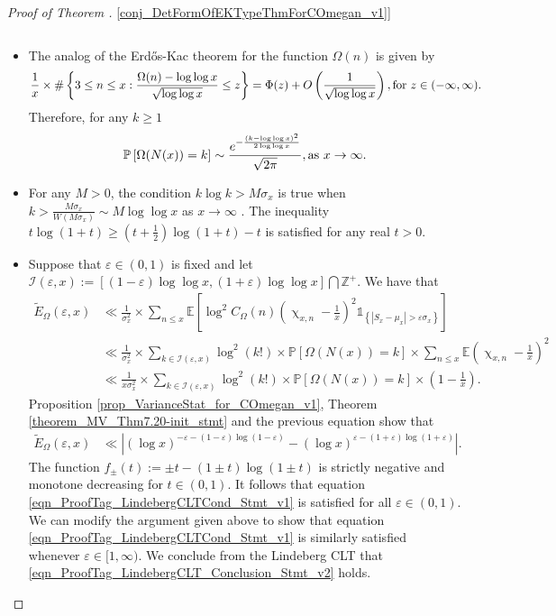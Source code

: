 \documentclass[11pt,reqno,a4letter]{article}
\newcommand{\hlocalref}[1]{\hyperref[#1]{\ref{#1}}}
\numberwithin{equation}{section}
\numberwithin{figure}{section}
\numberwithin{table}{section}
\renewcommand{\chi}{\upchi}
\theoremstyle{plain}
\numberwithin{theorem}{section}
\theoremstyle{definition}
\theoremstyle{remark}
\newcommand{\mathtext}[1]{\text{\rm #1}}
\begin{document}
\begin{proof}[Proof of Theorem \hlocalref{conj_DetFormOfEKTypeThmForCOmegan_v1}]
\begin{itemize}
\begin{equation}
\end{equation}
\item 
The analog of the Erd\H{o}s-Kac theorem for the function $\Omega(n)$ is given by 
\cite[Thm.~7.21; \S 7.4]{MV} 
\[
\frac{1}{x} \times \#\left\{3 \leq n \leq x: \frac{\Omega(n) - \log\log x}{\sqrt{\log\log x}} \leq z\right\} = 
     \Phi(z) + O\left(\frac{1}{\sqrt{\log\log x}}\right), \mathtext{ for } z \in (-\infty, \infty). 
\]
Therefore, for any $k \geq 1$ 
\[
\mathbb{P}\left[\Omega(N(x)) = k\right] \sim 
     \frac{e^{-\frac{(k-\log\log x)^2}{2\log\log x}}}{\sqrt{2\pi}}, 
     \mathtext{ as } x \rightarrow \infty. 
\]
\item 
For any $M > 0$, the condition $k\log k > M \sigma_x$ is true when 
$k > \frac{M \sigma_x}{W\left(M \sigma_x\right)} \sim M \log\log x$ 
as $x \rightarrow \infty$ \cite{LAMBERT-WFUNC-KNUTH}. 
The inequality $t \log(1+t) \geq \left(t + \frac{1}{2}\right) \log(1+t) - t$ 
is satisfied for any real $t > 0$. 
\item 
Suppose that $\varepsilon \in (0, 1)$ is fixed and 
let $\mathcal{I}(\varepsilon, x) := \left[(1-\varepsilon) \log\log x, (1+\varepsilon) \log\log x \right] \bigcap \mathbb{Z}^{+}$. 
We have that 
\begin{align*}
\widetilde{E}_{\Omega}(\varepsilon, x) & \ll 
     \frac{1}{\sigma_x^2} \times \sum_{n \leq x} \mathbb{E}\left[
     \log^2 C_{\Omega}(n) \left(\chi_{x,n} - \frac{1}{x}\right)^2 
     \mathds{1}_{\left\{\left\lvert S_x - \mu_x \right\rvert > \varepsilon\sigma_x\right\}}
     \right] \\ 
     & \ll \frac{1}{\sigma_x^2} \times \sum_{k \in \mathcal{I}(\varepsilon, x)} 
     \log^2(k!) \times \mathbb{P}\left[\Omega(N(x)) = k\right] \times \sum_{n \leq x} 
     \mathbb{E}\left(\chi_{x,n} - \frac{1}{x}\right)^2 \\ 
     & \ll \frac{1}{x \sigma_x^2} \times \sum_{k \in \mathcal{I}(\varepsilon, x)} 
     \log^2(k!) \times \mathbb{P}\left[\Omega(N(x)) = k\right] \times \left(1 - \frac{1}{x}\right). 
\end{align*}
Proposition \hlocalref{prop_VarianceStat_for_COmegan_v1}, 
Theorem \hlocalref{theorem_MV_Thm7.20-init_stmt} and the 
previous equation show that 
\begin{align*}
\widetilde{E}_{\Omega}(\varepsilon, x) & \ll 
      \left\lvert (\log x)^{-\varepsilon-(1-\varepsilon) \log(1-\varepsilon)} - 
      (\log x)^{\varepsilon-(1+\varepsilon) \log(1+\varepsilon)} \right\rvert. 
\end{align*}
The function $f_{\pm}(t) := \pm t - (1 \pm t) \log(1 \pm t)$ is strictly negative and 
monotone decreasing for $t \in (0, 1)$. 
It follows that equation \eqref{eqn_ProofTag_LindebergCLTCond_Stmt_v1} 
is satisfied for all $\varepsilon \in (0, 1)$. 
We can modify the argument given above to show that 
equation \eqref{eqn_ProofTag_LindebergCLTCond_Stmt_v1} is similarly satisfied 
whenever $\varepsilon \in [1, \infty)$. 
We conclude from the Lindeberg CLT that 
\eqref{eqn_ProofTag_LindebergCLT_Conclusion_Stmt_v2} holds. 
\qedhere
\end{itemize}
\end{proof}
\end{document}
